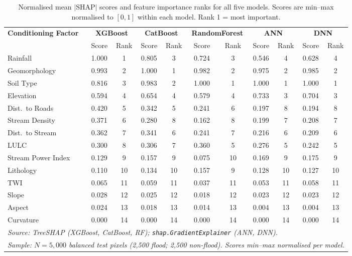 \documentclass[12pt, a4paper]{article}
\begin{document}
\begin{table}[H]
\centering
\caption{Normalised mean $|\text{SHAP}|$ scores and feature importance ranks for all five models. Scores are min--max normalised to $[0,1]$ within each model. Rank 1 = most important.}
\label{tab:shap_allmodels}
\begin{adjustbox}{max width=\linewidth}
\begin{tabular}{l cc cc cc cc cc}
\toprule
\multirow{2}{*}{\textbf{Conditioning Factor}}
  & \multicolumn{2}{c}{\textbf{XGBoost}}
  & \multicolumn{2}{c}{\textbf{CatBoost}}
  & \multicolumn{2}{c}{\textbf{RandomForest}}
  & \multicolumn{2}{c}{\textbf{ANN}}
  & \multicolumn{2}{c}{\textbf{DNN}} \\
\cmidrule(lr){2-3}\cmidrule(lr){4-5}\cmidrule(lr){6-7}\cmidrule(lr){8-9}\cmidrule(lr){10-11}
  & Score & Rank & Score & Rank & Score & Rank & Score & Rank & Score & Rank \\
\midrule
Rainfall           & 1.000 & 1  & 0.805 & 3  & 0.724 & 3  & 0.546 & 4  & 0.628 & 4  \\
Geomorphology      & 0.993 & 2  & 1.000 & 1  & 0.982 & 2  & 0.975 & 2  & 0.985 & 2  \\
Soil Type          & 0.816 & 3  & 0.983 & 2  & 1.000 & 1  & 1.000 & 1  & 1.000 & 1  \\
Elevation          & 0.594 & 4  & 0.654 & 4  & 0.579 & 4  & 0.733 & 3  & 0.704 & 3  \\
Dist.\ to Roads    & 0.420 & 5  & 0.342 & 5  & 0.241 & 6  & 0.197 & 8  & 0.194 & 8  \\
Stream Density     & 0.371 & 6  & 0.280 & 8  & 0.162 & 8  & 0.199 & 7  & 0.208 & 7  \\
Dist.\ to Stream   & 0.362 & 7  & 0.341 & 6  & 0.241 & 7  & 0.216 & 6  & 0.209 & 6  \\
LULC               & 0.300 & 8  & 0.306 & 7  & 0.360 & 5  & 0.276 & 5  & 0.242 & 5  \\
Stream Power Index & 0.129 & 9  & 0.157 & 9  & 0.075 & 10 & 0.169 & 9  & 0.175 & 9  \\
Lithology          & 0.110 & 10 & 0.134 & 10 & 0.157 & 9  & 0.128 & 10 & 0.127 & 10 \\
TWI                & 0.065 & 11 & 0.059 & 11 & 0.037 & 11 & 0.053 & 11 & 0.058 & 11 \\
Slope              & 0.028 & 12 & 0.025 & 12 & 0.018 & 12 & 0.023 & 12 & 0.023 & 12 \\
Aspect             & 0.024 & 13 & 0.018 & 13 & 0.014 & 13 & 0.004 & 13 & 0.004 & 13 \\
Curvature          & 0.000 & 14 & 0.000 & 14 & 0.000 & 14 & 0.000 & 14 & 0.000 & 14 \\
\bottomrule
\multicolumn{11}{l}{\textit{Source: TreeSHAP (XGBoost, CatBoost, RF); \texttt{shap.GradientExplainer} (ANN, DNN).}} \\
\multicolumn{11}{l}{\textit{Sample: $N = 5{,}000$ balanced test pixels (2,500 flood; 2,500 non-flood). Scores min--max normalised per model.}} \\
\end{tabular}
\end{adjustbox}
\end{table}
\end{document}
